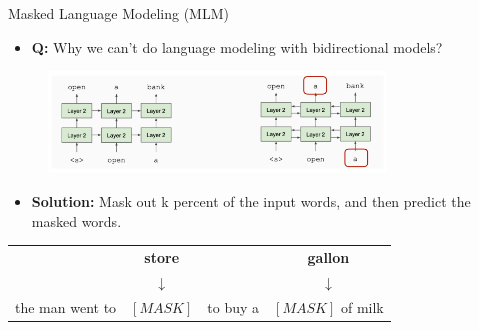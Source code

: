 \documentclass[serif, aspectratio=169]{beamer}
\begin{document}
\begin{frame}{Masked Language Modeling (MLM)}
    \begin{itemize}
        \item \textbf{Q:} Why we can’t do language modeling with bidirectional models?
    \end{itemize}
    
    \begin{figure}[h]
        \centering
        \includegraphics[width=0.8\textwidth]{Figures/MLM.png}
    \end{figure}
    
    \begin{itemize}
        \item \textbf{Solution:} Mask out k percent of the input words, and then predict the masked words.
    \end{itemize}
    
    \vspace{0.3cm}
    
    \begin{center}
        \begin{tabular}{c c c c}
            & \textbf{store} && \textbf{gallon} \\
            & $\downarrow$ && $\downarrow$ \\
            the man went to & $[MASK]$ & to buy a & $[MASK]$ of milk
        \end{tabular}
    \end{center}
\end{frame}
\end{document}

